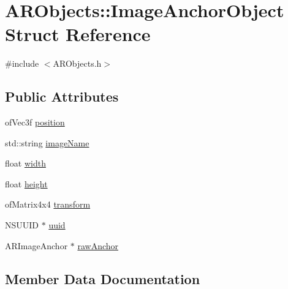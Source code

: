 \hypertarget{struct_a_r_objects_1_1_image_anchor_object}{}\section{A\+R\+Objects\+:\+:Image\+Anchor\+Object Struct Reference}
\label{struct_a_r_objects_1_1_image_anchor_object}


{\ttfamily \#include $<$A\+R\+Objects.\+h$>$}

\subsection*{Public Attributes}
\begin{DoxyCompactItemize}
\item 
of\+Vec3f \mbox{\hyperlink{struct_a_r_objects_1_1_image_anchor_object_ae93fd9e3483c843d1a9b2d9ab93a0f74}{position}}
\item 
std\+::string \mbox{\hyperlink{struct_a_r_objects_1_1_image_anchor_object_abf2e785ed814e008776e71ef285cc65a}{image\+Name}}
\item 
float \mbox{\hyperlink{struct_a_r_objects_1_1_image_anchor_object_a36cc74d5e63c752fb0fd2ff936f6bfa8}{width}}
\item 
float \mbox{\hyperlink{struct_a_r_objects_1_1_image_anchor_object_a9a3ad0429971725c44c7fdabb7906f7e}{height}}
\item 
of\+Matrix4x4 \mbox{\hyperlink{struct_a_r_objects_1_1_image_anchor_object_a0edd2668cf8cb348527d6ddcae0a497a}{transform}}
\item 
N\+S\+U\+U\+ID $\ast$ \mbox{\hyperlink{struct_a_r_objects_1_1_image_anchor_object_a08e09ab67adcd3ea4a152059eef3e5cf}{uuid}}
\item 
A\+R\+Image\+Anchor $\ast$ \mbox{\hyperlink{struct_a_r_objects_1_1_image_anchor_object_a1027a2a3ad750ab0b9f81c42371158be}{raw\+Anchor}}
\end{DoxyCompactItemize}


\subsection{Member Data Documentation}
\mbox{\label{struct_a_r_objects_1_1_image_anchor_object_a9a3ad0429971725c44c7fdabb7906f7e}} 

